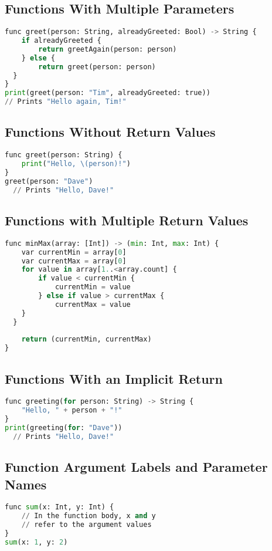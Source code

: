\documentclass[14pt]{extarticle}
\begin{document}
\subsection{Functions With Multiple Parameters}
\begin{lstlisting}[language=python]
func greet(person: String, alreadyGreeted: Bool) -> String { 
	if alreadyGreeted { 
		return greetAgain(person: person) 
	} else { 
		return greet(person: person) 
  }  
} 	
print(greet(person: "Tim", alreadyGreeted: true)) 
// Prints "Hello again, Tim!"
\end{lstlisting}


\subsection{Functions Without Return Values}
\begin{lstlisting}[language=python]
func greet(person: String) { 
	print("Hello, \(person)!") 	
} 
greet(person: "Dave") 
  // Prints "Hello, Dave!"
\end{lstlisting}


\subsection{Functions with Multiple Return Values}
\begin{lstlisting}[language=python]
func minMax(array: [Int]) -> (min: Int, max: Int) { 
	var currentMin = array[0] 
	var currentMax = array[0] 
	for value in array[1..<array.count] { 
		if value < currentMin { 
			currentMin = value
		} else if value > currentMax { 
			currentMax = value
	} 	
  } 
		
	return (currentMin, currentMax) 
}
\end{lstlisting}


\subsection{Functions With an Implicit Return}
\begin{lstlisting}[language=python]
func greeting(for person: String) -> String { 
	"Hello, " + person + "!"
}
print(greeting(for: "Dave")) 
  // Prints "Hello, Dave!"
\end{lstlisting}

\subsection{Function Argument Labels and Parameter Names}
\begin{lstlisting}[language=python]
func sum(x: Int, y: Int) { 
	// In the function body, x and y
	// refer to the argument values
} 
sum(x: 1, y: 2)
\end{lstlisting}
\end{document}
